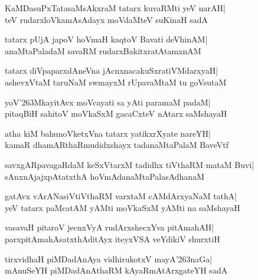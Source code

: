 \documentclass[twoside,12pt,openright]{book}
\def\S{\char'263}
\newcounter{shloka}[chapter]
\begin{document}
\begin{shloka}%
KaMDasuPxTatasaMsAkxraM tatarx kuvaRMti yeV narAH|\\
teV rudarxloVkamAsAdayx moVdaMteV suKinaH sadA
\end{shloka}

\begin{shloka}%
tatarx pUjA japoV hoVmaH kaqtoV Bavati deVhinAM|\\
anaMtaPaladaM savaRM rudarxBakitxratAtamxnAM
\end{shloka}

\begin{shloka}%
tatarx diVpaparxdAneVna jAcnxnacakuSxratiVMdarxyaH|\\
ashevxVtaM taruNaM swmayxM rUpavaMtaM tu goVsutaM
\end{shloka}

\begin{shloka}%
yoV\S MkayitAvx moVcayati sa yAti paramaM padaM|\\
pitaqBiH sahitoV moVkaSxM gacaCxteV nAtarx saMshayaH
\end{shloka}

\begin{shloka}%
atha kiM bahunoVketxVna tatarx yatikxrXyate nareYH|\\
kamaR dhamARthaRmudidxshayx tadanaMtaPalaM BaveVtf
\end{shloka}

\begin{shloka}%
savxgARpavagaRdaM keSxVtarxM tadidhx tiVthaRM mataM Buvi|\\
sAnxnAjajxpAtatxthA hoVmAdanaMtaPalasAdhanaM
\end{shloka}

\begin{shloka}%
gatAvx vArANasiVtiVthaRM varxtaM cAMdArxyaNaM tathA|\\
yeV tatarx paMcatAM yAMti moVkaSxM yAMti na saMshayaH
\end{shloka}

\begin{shloka}%
vasavaH pitaroV jecnxVyA rudArxshecxYva pitAmahAH|\\
parxpitAmahAsatxthAditAyx iteyxVSA veYdikiV shurxtiH
\end{shloka}

\begin{shloka}%
tirxvidhaH piMDadAnAya vidhirukotxV mayA\S naGa|\\
mAnuSeYH piMDadAnAthaRM kAyaRmAtArxgateYH sadA
\end{shloka}
\end{document}
